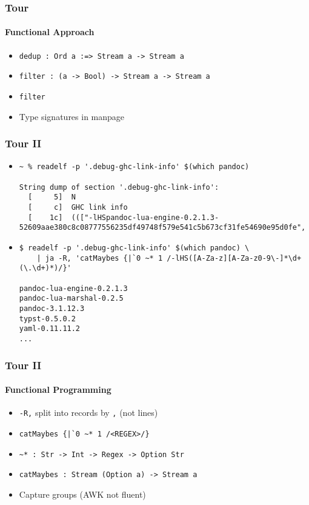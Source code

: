 \documentclass{beamer}
\begin{document}
\begin{frame}[fragile]
  \frametitle{Tour}
  \framesubtitle{Functional Approach}
  \begin{itemize}
    \item \verb|dedup : Ord a :=> Stream a -> Stream a|
    \item \verb|filter : (a -> Bool) -> Stream a -> Stream a|
    \item \verb|filter| 
    \item Type signatures in manpage
  \end{itemize}
\end{frame}

\begin{frame}[fragile]
  \frametitle{Tour II}
  \begin{itemize}
    \item
      \begin{verbatim}
~ % readelf -p '.debug-ghc-link-info' $(which pandoc)

String dump of section '.debug-ghc-link-info':
  [     5]  N
  [     c]  GHC link info
  [    1c]  ((["-lHSpandoc-lua-engine-0.2.1.3-52609aae380c8c08777556235df49748f579e541c5b673cf31fe54690e95d0fe",
      \end{verbatim}
    \item
      \begin{verbatim}
$ readelf -p '.debug-ghc-link-info' $(which pandoc) \
    | ja -R, 'catMaybes {|`0 ~* 1 /-lHS([A-Za-z][A-Za-z0-9\-]*\d+(\.\d+)*)/}'

pandoc-lua-engine-0.2.1.3
pandoc-lua-marshal-0.2.5
pandoc-3.1.12.3
typst-0.5.0.2
yaml-0.11.11.2
...
      \end{verbatim}
  \end{itemize}
\end{frame}

\begin{frame}[fragile]
  \frametitle{Tour II}
  \framesubtitle{Functional Programming}
  \begin{itemize}
    \item \verb|-R,| split into records by \verb|,| (not lines)
    \item \verb,catMaybes {|`0 ~* 1 /<REGEX>/},
    \item \verb|~* : Str -> Int -> Regex -> Option Str|
    \item \verb|catMaybes : Stream (Option a) -> Stream a|
    \item Capture groups (AWK not fluent)
  \end{itemize}
\end{frame}
\end{document}
